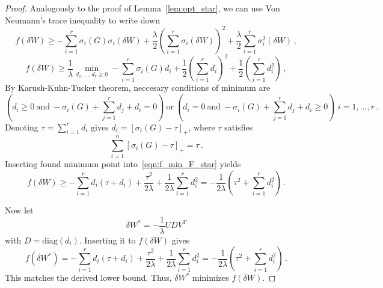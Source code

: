 \documentclass{article} %
\begin{document}
\begin{proof}
Analogously to the proof of Lemma~\ref{lem:opt_star}, we can use Von Neumann's trace inequality to write down
\begin{equation*}
    f(\delta W) \geq -\sum_{i=1}^r \sigma_i(G)\sigma_i(\delta W) + \frac{\lambda}{2}\left(\sum_{i=1}^{r}\sigma_i(\delta W)\right)^2 + \frac{\lambda}{2}\sum_{i=1}^{r}\sigma_i^2(\delta W)\,,
\end{equation*}
\begin{equation}\label{eqn:f_min_F_star}
    f(\delta W) \geq \frac{1}{\lambda}\min_{d_1,\dots,d_r \geq 0}-\sum_{i=1}^r \sigma_i(G)d_i + \frac{1}{2}\left(\sum_{i=1}^{r}d_i\right)^2 + \frac{1}{2}\left(\sum_{i=1}^{r}d_i^2\right)\,,
\end{equation}
By Karush-Kuhn-Tucker theorem, neccesary conditions of minimum are
\begin{equation*}
    \left(d_i \geq 0\ \text{and}\ -\sigma_i(G) + \sum_{j=1}^{r}d_j +  d_i = 0\right)\ \text{or}\ \left(d_i = 0\ \text{and}\ -\sigma_i(G) + \sum_{j=1}^{r}d_j + d_i \geq 0\right) \,\, i = 1,\dots,r\,.
\end{equation*}
Denoting $\tau = \sum_{i = 1}^r d_i$ gives $d_i = [\sigma_i(G) - \tau]_+$, where $\tau$ satisfies
\begin{equation}
    \sum_{i=1}^n [\sigma_i(G) - \tau]_+ = \tau\,.
\end{equation}
Inserting found minimum point into~\eqref{eqn:f_min_F_star} yields
\begin{equation*}
    f(\delta W) \geq -\sum_{i = 1}^r d_i(\tau + d_i) + \frac{\tau^2}{2\lambda} + \frac{1}{2\lambda}\sum_{i=1}^{r}d_i^2 = -\frac{1}{2 \lambda} \left( \tau^2 + \sum_{i=1}^r d_i^2 \right)\,.
\end{equation*}

Now let
\begin{equation}
\delta W^* = -\frac{1}{\lambda}UDV^T
\end{equation} 
with $D = \text{diag}(d_i)$. Inserting it to $f(\delta W)$ gives
\begin{equation*}
    f(\delta W^*) = -\sum_{i = 1}^r d_i(\tau + d_i) + \frac{\tau^2}{2\lambda} + \frac{1}{2\lambda}\sum_{i=1}^{r}d_i^2 = -\frac{1}{2 \lambda} \left( \tau^2 + \sum_{i=1}^r d_i^2 \right)\,.
\end{equation*}
This matches the derived lower bound. Thus, $\delta W^*$ minimizes $f(\delta W)$.
\end{proof}
\end{document}
